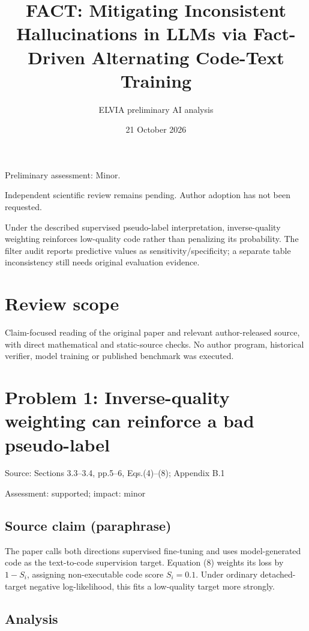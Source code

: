 \documentclass[11pt]{article}
\begin{document}
\title{FACT: Mitigating Inconsistent Hallucinations in LLMs via Fact-Driven Alternating Code-Text Training}

\author{ELVIA preliminary AI analysis}\date{21 October 2026}\maketitle

Preliminary assessment: Minor.\par

Independent scientific review remains pending. Author adoption has not been requested.

Under the described supervised pseudo-label interpretation, inverse-quality weighting reinforces low-quality code rather than penalizing its probability. The filter audit reports predictive values as sensitivity/specificity; a separate table inconsistency still needs original evaluation evidence.

\section*{Review scope}

Claim-focused reading of the original paper and relevant author-released source, with direct mathematical and static-source checks. No author program, historical verifier, model training or published benchmark was executed.

\section*{Problem 1: Inverse-quality weighting can reinforce a bad pseudo-label}

Source: Sections 3.3–3.4, pp.5–6, Eqs.(4)–(8); Appendix B.1

Assessment: supported; impact: minor

\subsection*{Source claim (paraphrase)}

The paper calls both directions supervised fine-tuning and uses model-generated code as the text-to-code supervision target. Equation (8) weights its loss by \(1-S_i\), assigning non-executable code score \(S_i=0.1\). Under ordinary detached-target negative log-likelihood, this fits a low-quality target more strongly.

\subsection*{Analysis}
\end{document}
